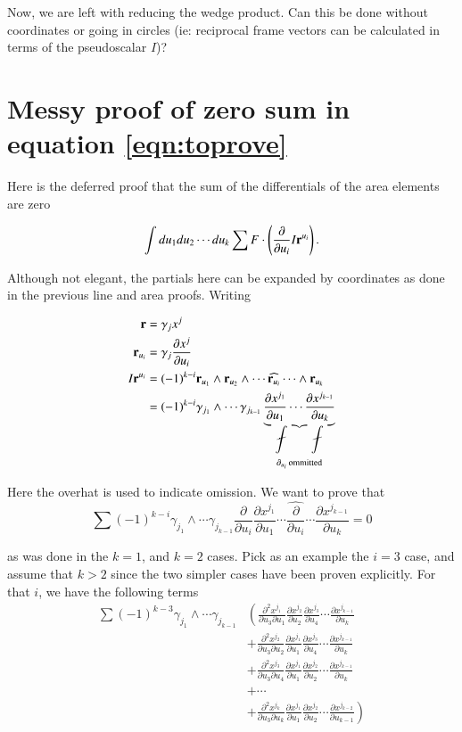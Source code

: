 \documentclass{article}
\newcommand{\PD}[2]{\frac{\partial {#2}}{\partial {#1}}}
\newcommand{\PDD}[3]{\frac{\partial^2 {#3}}{\partial {#1}\partial {#2}}}
\begin{document}
Now, we are left with reducing the wedge product.  Can this be done without coordinates or going in circles (ie: reciprocal frame vectors can be calculated in terms of the pseudoscalar $I$)?

\section{ Messy proof of zero sum in equation \ref{eqn:toprove} }

Here is the deferred proof that the sum of the differentials of the area elements are zero

\begin{align*}
\int du_1 du_2 \cdots du_k \sum F \cdot \left( \PD{u_i}{} I \Br^{u_i} \right).
\end{align*}

Although not elegant, the partials here can be expanded by coordinates as done in the previous line and area proofs.
Writing

\begin{align*}
\Br &= \gamma_j x^j \\
\Br_{u_i} &= \gamma_j \PD{u_i}{x^j} \\
I \Br^{u_i}
&= (-1)^{k-i} \Br_{u_1} \wedge \Br_{u_2} \wedge \cdots \widehat{\Br_{u_i}} \cdots \wedge \Br_{u_k} \\
&= (-1)^{k-i} 
\gamma_{j_1} \wedge \cdots \gamma_{j_{k-1}} 
\underbrace{\PD{u_1}{x^{j_1}} \cdots \PD{u_k}{x^{j_{k-1}}}}_{\partial_{u_i} \,\text{ommitted} } \\
\end{align*}

Here the overhat is used to indicate omission.  We want to prove that 
\begin{equation}
\sum (-1)^{k-i} \gamma_{j_1} \wedge \cdots \gamma_{j_{k-1}} \PD{u_i}{} \PD{u_1}{x^{j_1}} \cdots \widehat{\PD{u_i}{}} \cdots \PD{u_k}{x^{j_{k-1}}} = 0
\end{equation}

as was done in the $k=1$, and $k=2$ cases.  Pick as an example the $i=3$ case, and assume that $k > 2$ since
the two simpler cases have been proven explicitly.  For that $i$, we have the following terms
\begin{align*}
\sum (-1)^{k-3} \gamma_{j_1} \wedge \cdots \gamma_{j_{k-1}} 
&\left(\PDD{u_3}{u_1}{x^{j_1}} \PD{u_2}{x^{j_{2}}} \PD{u_4}{x^{j_3}} \cdots \PD{u_k}{x^{j_{k-1}}}\right. \\
&+\PDD{u_3}{u_2}{x^{j_2}} \PD{u_1}{x^{j_1}} \PD{u_4}{x^{j_3}} \cdots \PD{u_k}{x^{j_{k-1}}} \\
&+\PDD{u_3}{u_4}{x^{j_3}} \PD{u_1}{x^{j_1}} \PD{u_2}{x^{j_2}} \cdots \PD{u_k}{x^{j_{k-1}}} \\
&+\cdots \\
&+\left.\PDD{u_3}{u_k}{x^{j_k}} \PD{u_1}{x^{j_1}} \PD{u_2}{x^{j_2}} \cdots \PD{u_{k-1}}{x^{j_{k-2}}}\right)
\end{align*}
\end{document}

